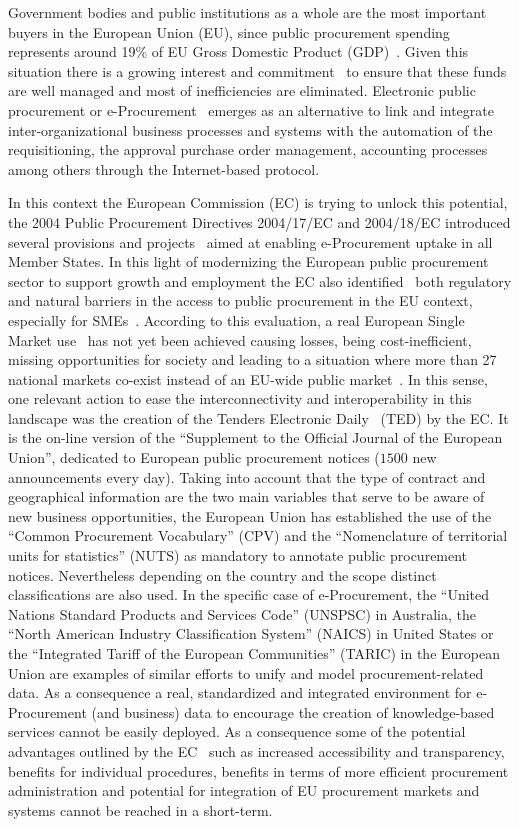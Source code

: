 Government bodies and public institutions as a whole are the most important buyers in the European Union (EU), since public procurement spending represents around 19\% of 
EU Gross Domestic Product (GDP)~\cite{d2010}. Given this situation there is a growing interest and commitment~\cite{d2010a} to ensure that these funds are 
well managed and most of inefficiencies are eliminated. Electronic public procurement or e-Procurement~\cite{Podlogar2007} emerges as an alternative to link and 
integrate inter-organizational business processes and systems with the automation of the requisitioning, the approval purchase order 
management, accounting processes among others through the Internet-based protocol. 

In this context the European Commission (EC) is trying to unlock this potential, the 2004 Public Procurement Directives 2004/17/EC and 2004/18/EC 
introduced several provisions and projects~\cite{peppol,e-certis} aimed at enabling e-Procurement uptake in all Member States. In this light of 
modernizing the European public procurement sector to support growth and employment the EC also identified~\cite{siemensEval} 
both regulatory and natural barriers in the access to public procurement in the EU context, especially for SMEs~\cite{d2008}. 
According to this evaluation, a real European Single Market use~\cite{d2011} has not yet been achieved causing losses, 
being cost-inefficient, missing opportunities for society and leading to a situation where more than 27 national markets 
co-exist instead of an EU-wide public market~\cite{monti2010}. In this sense, one relevant action to ease the interconnectivity and interoperability in this landscape was the creation of the Tenders Electronic Daily~\cite{eNotices,formsTed} (TED) 
by the EC. It is the on-line version of the ``Supplement to the Official Journal of the European Union'', dedicated to European public procurement notices 
($1500$ new announcements every day). Taking into account that the type of contract and geographical information are the two main variables 
that serve to be aware of new business opportunities, the European Union has established the use of the ``Common Procurement Vocabulary'' (CPV) 
and the ``Nomenclature of territorial units for statistics'' (NUTS) as mandatory to annotate public procurement notices. Nevertheless depending on the country and the scope distinct classifications are also used. 
In the specific case of e-Procurement, the ``United Nations Standard Products and Services Code'' (UNSPSC) in Australia, the ``North American Industry Classification System'' (NAICS) in United States or 
the ``Integrated Tariff of the European Communities'' (TARIC) in the European Union are examples of similar efforts to unify 
and model procurement-related data. As a consequence a real, standardized and integrated environment for e-Procurement (and business) data 
to encourage the creation of knowledge-based services cannot be easily deployed. As a consequence some of the potential advantages 
outlined by the EC~\cite{d2010} such as increased accessibility and transparency, benefits for individual procedures, 
benefits in terms of more efficient procurement administration and potential for integration of EU procurement markets and systems cannot be reached in a 
short-term. 

